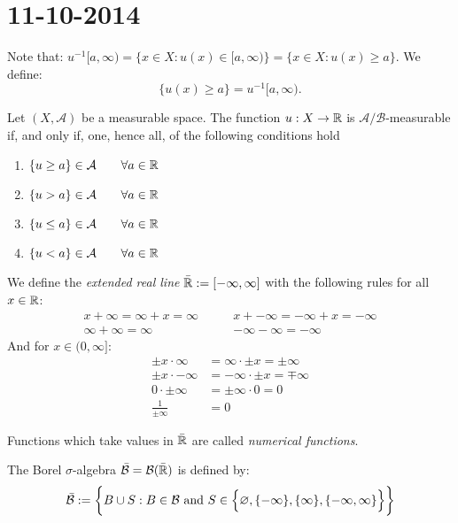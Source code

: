 \section{11-10-2014}
\begin{defn}
Note that:
\(u^{-1}[a,\infty )=\{x\in X:u(x)\in [a,\infty )\}=\{x\in X:u(x)\geq a\}.\)
We define:
\[
\{u(x)\geq a\}=u^{-1}[a,\infty ).
\]
\end{defn}

\begin{thm}
Let \((X,\mathcal{A})\) be a measurable space. The function \(u:X\rightarrow \Bbb{R}\) is \(\mathcal{A}/\mathcal{B}\)-measurable if, and only if, one, hence all, of the following conditions hold

\begin{enumerate}
  \item \(\{u\geq a\}\in \mathcal{A} \qquad \forall a\in \Bbb{R}\)
  \item \(\{u>a\}\in \mathcal{A} \qquad \forall a\in \Bbb{R}\)
  \item \(\{u\leq a\}\in \mathcal{A} \qquad \forall a\in \Bbb{R}\)
  \item \(\{u<a\}\in \mathcal{A} \qquad \forall a\in \Bbb{R}\)
\end{enumerate}
\end{thm}


\begin{defn}
We define the \emph{extended real line \(\bar{\Bbb{R}}:=[-\infty ,\infty ]\)} with the following rules for all \(x\in \Bbb{R}\):
\begin{align*}
x+\infty =\infty +x=\infty  \qquad &x+-\infty =-\infty +x=-\infty  \\
\infty +\infty =\infty  \qquad &-\infty -\infty =-\infty 
\end{align*}
And for \(x\in (0,\infty ]:\)
\begin{align*}
\pm x\cdot \infty &=\infty \cdot \pm x=\pm \infty  \\
\pm x\cdot -\infty &=-\infty \cdot \pm x=\mp \infty  \\
0\cdot \pm \infty &=\pm \infty \cdot 0=0 \\
\frac{1}{\pm \infty }&=0
\end{align*}
\end{defn}

\begin{defn}
Functions which take values in \(\bar{\Bbb{R}}\) are called \emph{numerical functions}.
\end{defn}

\begin{defn}
The Borel \(\sigma \)-algebra \(\bar{\mathcal{B}}=\mathcal{B}(\bar{\Bbb{R}})\) is defined by:
\[
\bar{\mathcal{B}}:=\bigg\{B\cup S : B\in \mathcal{B}\space  \text{ and }\space S\in \Big\{\varnothing ,\{-\infty \},\{\infty \},\{-\infty ,\infty \}\Big\}\bigg\}
\]
\end{defn}

